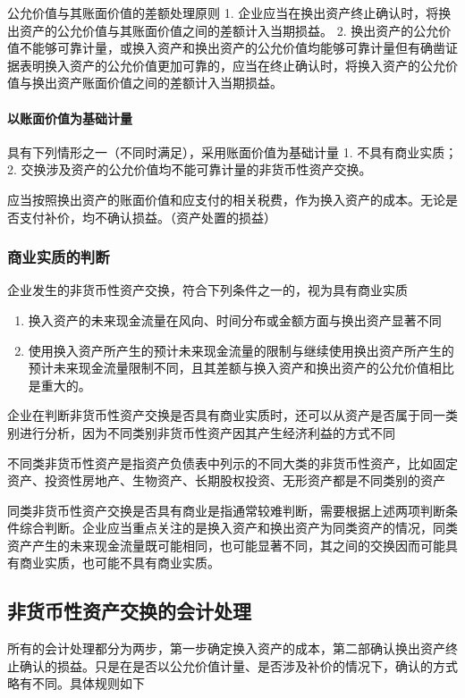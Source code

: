 \documentclass[UTF8,12pt]{ctexart}
\numberwithin{equation}{section} %
\numberwithin{figure}{section}
\numberwithin{table}{section}
\begin{document}
	公允价值与其账面价值的差额处理原则
	1.	企业应当在换出资产终止确认时，将换出资产的公允价值与其账面价值之间的差额计入当期损益。
	2.	换出资产的公允价值不能够可靠计量，或换入资产和换出资产的公允价值均能够可靠计量但有确凿证据表明换入资产的公允价值更加可靠的，应当在终止确认时，将换入资产的公允价值与换出资产账面价值之间的差额计入当期损益。
	
	
	
	\paragraph{以账面价值为基础计量}
	具有下列情形之一（不同时满足），采用账面价值为基础计量
	1.	不具有商业实质；
	2.	交换涉及资产的公允价值均不能可靠计量的非货币性资产交换。
	
	应当按照换出资产的账面价值和应支付的相关税费，作为换入资产的成本。无论是否支付补价，均不确认损益。（资产处置的损益）
	
	\subsubsection{商业实质的判断}
	企业发生的非货币性资产交换，符合下列条件之一的，视为具有商业实质
	\begin{enumerate}
		\item 换入资产的未来现金流量在风向、时间分布或金额方面与换出资产显著不同
		
		\item 使用换入资产所产生的预计未来现金流量的限制与继续使用换出资产所产生的预计未来现金流量限制不同，且其差额与换入资产和换出资产的公允价值相比是重大的。
	\end{enumerate}
	
	企业在判断非货币性资产交换是否具有商业实质时，还可以从资产是否属于同一类别进行分析，因为不同类别非货币性资产因其产生经济利益的方式不同
	
	不同类非货币性资产是指资产负债表中列示的不同大类的非货币性资产，比如固定资产、投资性房地产、生物资产、长期股权投资、无形资产都是不同类别的资产
	
	同类非货币性资产交换是否具有商业是指通常较难判断，需要根据上述两项判断条件综合判断。企业应当重点关注的是换入资产和换出资产为同类资产的情况，同类资产产生的未来现金流量既可能相同，也可能显著不同，其之间的交换因而可能具有商业实质，也可能不具有商业实质。
	
	
	\subsection{非货币性资产交换的会计处理}
	所有的会计处理都分为两步，第一步确定换入资产的成本，第二部确认换出资产终止确认的损益。只是在是否以公允价值计量、是否涉及补价的情况下，确认的方式略有不同。具体规则如下
\end{document}
